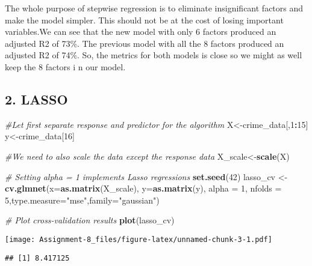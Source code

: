\documentclass[
]{article}
\newenvironment{Shaded}{\begin{snugshade}}{\end{snugshade}}
\newcommand{\CommentTok}[1]{\textcolor[rgb]{0.56,0.35,0.01}{\textit{#1}}}
\newcommand{\DataTypeTok}[1]{\textcolor[rgb]{0.13,0.29,0.53}{#1}}
\newcommand{\DecValTok}[1]{\textcolor[rgb]{0.00,0.00,0.81}{#1}}
\newcommand{\KeywordTok}[1]{\textcolor[rgb]{0.13,0.29,0.53}{\textbf{#1}}}
\newcommand{\NormalTok}[1]{#1}
\newcommand{\OperatorTok}[1]{\textcolor[rgb]{0.81,0.36,0.00}{\textbf{#1}}}
\newcommand{\StringTok}[1]{\textcolor[rgb]{0.31,0.60,0.02}{#1}}
\begin{document}
The whole purpose of stepwise regression is to eliminate insignificant
factors and make the model simpler. This should not be at the cost of
losing important variables.We can see that the new model with only 6
factors produced an adjusted R2 of 73\%. The previous model with all the
8 factors produced an adjusted R2 of 74\%. So, the metrics for both
models is close so we might as well keep the 8 factors i n our model.

\hypertarget{lasso}{%
\subsection{2. LASSO}\label{lasso}}

\begin{Shaded}
\begin{Highlighting}[]
\CommentTok{#Let first separate response and predictor for the algorithm}
\NormalTok{X<-crime_data[,}\DecValTok{1}\OperatorTok{:}\DecValTok{15}\NormalTok{]}
\NormalTok{y<-crime_data[}\DecValTok{16}\NormalTok{]}

\CommentTok{#We need to also scale the data except the response data}
\NormalTok{X_scale<-}\KeywordTok{scale}\NormalTok{(X)}

\CommentTok{# Setting alpha = 1 implements Lasso regressions}
\KeywordTok{set.seed}\NormalTok{(}\DecValTok{42}\NormalTok{)}
\NormalTok{lasso_cv <-}\StringTok{ }\KeywordTok{cv.glmnet}\NormalTok{(}\DataTypeTok{x=}\KeywordTok{as.matrix}\NormalTok{(X_scale), }\DataTypeTok{y=}\KeywordTok{as.matrix}\NormalTok{(y), }\DataTypeTok{alpha =} \DecValTok{1}\NormalTok{,}
                     \DataTypeTok{nfolds =} \DecValTok{5}\NormalTok{,}\DataTypeTok{type.measure=}\StringTok{"mse"}\NormalTok{,}\DataTypeTok{family=}\StringTok{"gaussian"}\NormalTok{)}

\CommentTok{# Plot cross-validation results}
\KeywordTok{plot}\NormalTok{(lasso_cv)}
\end{Highlighting}
\end{Shaded}

\texttt{[image: Assignment-8\_files/figure-latex/unnamed-chunk-3-1.pdf]}

\begin{Shaded}
\end{Shaded}

\begin{verbatim}
## [1] 8.417125
\end{verbatim}
\end{document}
